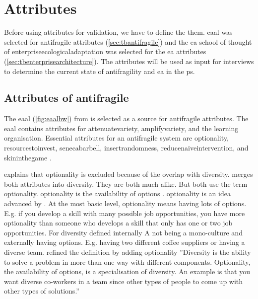 \chapter{Attributes}
\label{ch:attributes}
\setcounter{footnote}{0}
Before using \glspl{attribute} for validation, we have to define the them. \acrlong{eaal} \parencite[p.~7]{Botjes2021} was selected for \gls{antifragile} \glspl{attribute} (\cref{sec:tbantifragile}) and the \acrlong{ea} school of thought of \gls{enterpriseecologicaladaptation} was selected for the \acrlong{ea} \glspl{attribute} (\cref{sec:tbenterprisearchitecture}). The \glspl{attribute} will be used as input for interviews to determine the current state of \gls{antifragility} and \acrlong{ea} in the \gls{ps}.
\section{Attributes of antifragile}
\label{sec:attributesofantifragile}
The \acrlong{eaal} (\cref{fig:eaalbw}) from \textcite[p.~7]{Botjes2021} is selected as a source for \gls{antifragile} attributes. The \acrlong{eaal} contains \glspl{attribute} for \gls{attenuatevariety}, \gls{amplifyvariety}, and the learning organisation. Essential attributes for an \gls{antifragile} system are \gls{optionality}, \gls{resourcestoinvest}, \gls{senecabarbell}, \gls{insertrandomness}, \gls{reducenaiveintervention}, and \gls{skininthegame} \parencite[p.~64]{Botjes2020}.

\textcite[p.~64]{Botjes2020} explains that \gls{optionality} is excluded because of the overlap with \gls{diversity}. \textcite[p.~66]{Botjes2020} merges both attributes into \gls{diversity}. They are both much alike. But \textcites{Taleb2012}{Gorgeon2015} both use the term \gls{optionality}. \Gls{optionality} is the availability of options \parencites[pp.~176--177]{Taleb2012}[p.~9]{Gorgeon2015}. \Gls{optionality} is an idea advanced by \textcite{Taleb2012}. At the most basic level, \gls{optionality} means having lots of options. E.g. if you develop a skill with many possible job opportunities, you have more \gls{optionality} than someone who develops a skill that only has one or two job opportunities. For \gls{diversity} \textcite{Botjes2020} defined internally A not being a mono-culture and externally having options. E.g. having two different coffee suppliers or having a diverse team. \textcite[Table II]{Botjes2021} refined the definition by adding optionality ''Diversity is the ability to solve a problem in more than one way with different components. Optionality, the availability of options, is a specialisation of diversity. An example is that you want diverse co-workers in a team since other types of people to come up with other types of solutions.''


